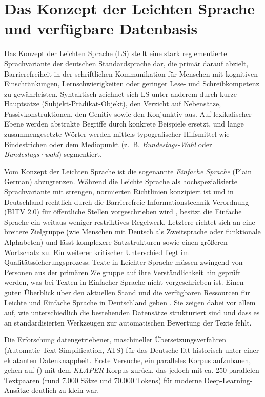 \section{Das Konzept der Leichten Sprache und verfügbare Datenbasis}
\label{sec:konzept_leichte_sprache}

Das Konzept der Leichten Sprache (LS) stellt eine stark reglementierte Sprachvariante der deutschen Standardsprache dar, die primär darauf abzielt, Barrierefreiheit in der schriftlichen Kommunikation für Menschen mit kognitiven Einschränkungen, Lernschwierigkeiten oder geringer Lese- und Schreibkompetenz zu gewährleisten. Syntaktisch zeichnet sich LS unter anderem durch kurze Hauptsätze (Subjekt-Prädikat-Objekt), den Verzicht auf Nebensätze, Passivkonstruktionen, den Genitiv sowie den Konjunktiv aus. Auf lexikalischer Ebene werden abstrakte Begriffe durch konkrete Beispiele ersetzt, und lange zusammengesetzte Wörter werden mittels typografischer Hilfsmittel wie Bindestrichen oder dem Mediopunkt (z.~B. \textit{Bundestags-Wahl} oder \textit{Bundestags·wahl}) segmentiert. 

Vom Konzept der Leichten Sprache ist die sogenannte \textit{Einfache Sprache} (Plain German) abzugrenzen. Während die Leichte Sprache als hochspezialisierte Sprachvariante mit strengen, normierten Richtlinien konzipiert ist und in Deutschland rechtlich durch die Barrierefreie-Informationstechnik-Verordnung (BITV 2.0) für öffentliche Stellen vorgeschrieben wird \citep{bund2026barrierefreiheit}, besitzt die Einfache Sprache ein weitaus weniger restriktives Regelwerk. Letztere richtet sich an eine breitere Zielgruppe (wie Menschen mit Deutsch als Zweitsprache oder funktionale Alphabeten) und lässt komplexere Satzstrukturen sowie einen größeren Wortschatz zu. Ein weiterer kritischer Unterschied liegt im Qualitätssicherungsprozess: Texte in Leichter Sprache müssen zwingend von Personen aus der primären Zielgruppe auf ihre Verständlichkeit hin geprüft werden, was bei Texten in Einfacher Sprache nicht vorgeschrieben ist. Einen guten Überblick über den aktuellen Stand und die verfügbaren Ressourcen für Leichte und Einfache Sprache in Deutschland geben \citet{madina2023easy}. Sie zeigen dabei vor allem auf, wie unterschiedlich die bestehenden Datensätze strukturiert sind und dass es an standardisierten Werkzeugen zur automatischen Bewertung der Texte fehlt.

Die Erforschung datengetriebener, maschineller Übersetzungsverfahren (Automatic Text Simplification, ATS) für das Deutsche litt historisch unter einer eklatanten Datenknappheit. Erste Versuche, ein paralleles Korpus aufzubauen, gehen auf \citeauthor{klaper2013klaper} (\citeyear{klaper2013klaper}) mit dem \textit{KLAPER}-Korpus zurück, das jedoch mit ca. 250 parallelen Textpaaren (rund 7.000 Sätze und 70.000 Tokens) für moderne Deep-Learning-Ansätze deutlich zu klein war. 

